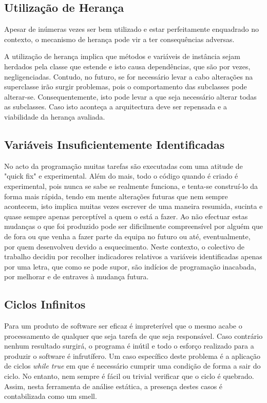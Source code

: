\subsection{Utilização de Herança}

\hspace{5mm} Apesar de inúmeras vezes ser bem utilizado e estar perfeitamente enquadrado no contexto, o mecanismo de herança pode vir a ter consequências adversas. 
\par A utilização de herança implica que métodos e variáveis de instância sejam herdados pela classe que estende e isto causa dependências, que são por vezes, negligenciadas. Contudo, no futuro, se for necessário levar a cabo alterações na superclasse irão surgir problemas, pois o comportamento das subclasses pode alterar-se. Consequentemente, isto pode levar a que seja necessário alterar todas as subclasses. Caso isto aconteça a arquitectura deve ser repensada e a viabilidade da herança avaliada.

\subsection{Variáveis Insuficientemente Identificadas}

\hspace{5mm} No acto da programação muitas tarefas são executadas com uma atitude de "quick fix" e experimental. Além do mais, todo o código quando é criado é experimental, pois nunca se sabe se realmente funciona, e tenta-se construí-lo da forma mais rápida, tendo em mente alterações futuras que nem sempre acontecem, isto implica muitas vezes escrever de uma maneira resumida, sucinta e quase sempre apenas perceptível a quem o está a fazer. Ao não efectuar estas mudanças o que foi produzido pode ser dificilmente compreensível por alguém que de fora ou que venha a fazer parte da equipa no futuro ou até, eventualmente, por quem desenvolveu devido a esquecimento. Neste contexto, o colectivo de trabalho decidiu por recolher indicadores relativos a variáveis identificadas apenas por uma letra, que como se pode supor, são indícios de programação inacabada, por melhorar e de entraves à mudança futura.

\subsection{Ciclos Infinitos}

\hspace{5mm} Para um produto de software ser eficaz é impreterível que o mesmo acabe o processamento de qualquer que seja tarefa de que seja responsável. Caso contrário nenhum resultado surgirá, o programa é inútil  e todo o esforço realizado para a produzir o software é infrutífero. Um caso específico deste problema é a aplicação de ciclos \textit{while true} em que é necessário cumprir uma condição de forma a sair do ciclo. No entanto, nem sempre é fácil ou trivial verificar que o ciclo é quebrado. Assim, nesta ferramenta de análise estática, a presença destes casos é contabilizada como um smell.

